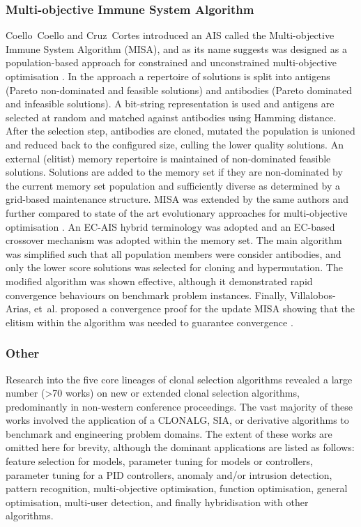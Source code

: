%
%
\subsubsection{Multi-objective Immune System Algorithm}
\label{subsubsec:misa}
Coello~Coello and Cruz~Cortes introduced an AIS called the Multi-objective Immune System Algorithm (MISA), and as its name suggests was designed as a population-based approach for constrained and unconstrained multi-objective optimisation \cite{Coello2002}. In the approach a repertoire of solutions is split into antigens (Pareto non-dominated and feasible solutions) and antibodies (Pareto dominated and infeasible solutions). A bit-string representation is used and antigens are selected at random and matched against antibodies using Hamming distance. After the selection step, antibodies are cloned, mutated the population is unioned and reduced back to the configured size, culling the lower quality solutions. An external (elitist) memory repertoire is maintained of non-dominated feasible solutions. Solutions are added to the memory set if they are non-dominated by the current memory set population and sufficiently diverse as determined by a grid-based maintenance structure. MISA was extended by the same authors and further compared to state of the art evolutionary approaches for multi-objective optimisation \cite{Cortes2003}. An EC-AIS hybrid terminology was adopted and an EC-based crossover mechanism was adopted within the memory set. The main algorithm was simplified such that all population members were consider antibodies, and only the lower score solutions was selected for cloning and hypermutation. The modified algorithm was shown effective, although it demonstrated rapid convergence behaviours on benchmark problem instances. Finally, Villalobos-Arias, et~al. proposed a convergence proof for the update MISA showing that the elitism within the algorithm was needed to guarantee convergence  \cite{Villalobos-Arias2004}.

%
%
\subsubsection{Other}
\label{subsubsec::cs:taxonomy:other}
Research into the five core lineages of clonal selection algorithms revealed a large number (\textgreater70 works) on new or extended clonal selection algorithms, predominantly in non-western conference proceedings. The vast majority of these works involved the application of a CLONALG, SIA, or derivative algorithms to benchmark and engineering problem domains. The extent of these works are omitted here for brevity, although the dominant applications are listed as follows: feature selection for models, parameter tuning for models or controllers, parameter tuning for a PID controllers, anomaly and/or intrusion detection, pattern recognition, multi-objective optimisation, function optimisation, general optimisation, multi-user detection, and finally hybridisation with other algorithms.


